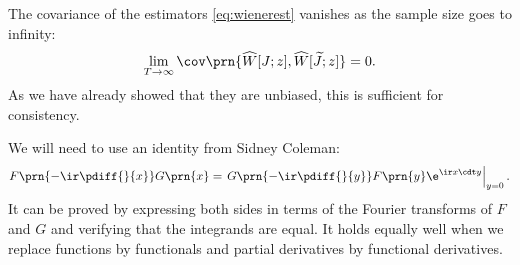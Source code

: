 \documentclass[12pt]{article}
\newcommand{\tj}{\widetilde{J}}
\newcommand{\hw}{\widehat{W}}
\begin{document}
\begin{thm}
  The covariance of the estimators \eqref{eq:wienerest} vanishes as the sample size goes to infinity:
  \begin{equation}\label{eq:wienercons}
    \lim_{T\to\infty} \cov\prn{ \hw[J;z], \hw[\tj;z] } = 0.
  \end{equation}
  As we have already showed that they are unbiased, this is sufficient for consistency.
\label{th:wienercons}
\end{thm}
%
We will need to use an identity from Sidney Coleman:
%
\begin{equation}\label{eq:coleman}
  F\prn{-\ir\pdiff{}{x}} G\prn{x}
      = \left. G\prn{-\ir\pdiff{}{y}} F\prn{y} \e^{\ir x \cdt y} \right|_{y=0}.
\end{equation}
%
It can be proved by expressing both sides in terms of the Fourier transforms of $F$ and $G$ and verifying that the integrands are equal.
It holds equally well when we replace functions by functionals and partial derivatives by functional derivatives.
%
\end{document}
